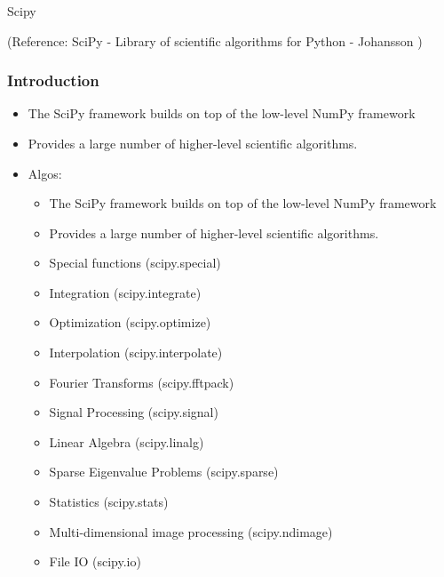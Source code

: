 \begin{frame}[fragile]\frametitle{}
\begin{center}
{\Large Scipy}

(Reference: 
SciPy - Library of scientific algorithms for Python - Johansson )
\end{center}
\end{frame}


\begin{frame}[fragile]\frametitle{Introduction}
 \begin{itemize}
  \item The SciPy framework builds on top of the low-level NumPy framework 
  \item Provides a large number of higher-level scientific algorithms. 
  \item Algos:
   \begin{itemize}
  \item The SciPy framework builds on top of the low-level NumPy framework 
  \item Provides a large number of higher-level scientific algorithms. 
  \item Special functions (scipy.special)
  \item Integration (scipy.integrate)
  \item Optimization (scipy.optimize)
  \item Interpolation (scipy.interpolate)
  \item Fourier Transforms (scipy.fftpack)
  \item Signal Processing (scipy.signal)
  \item Linear Algebra (scipy.linalg)
  \item Sparse Eigenvalue Problems (scipy.sparse)
  \item Statistics (scipy.stats)
  \item Multi-dimensional image processing (scipy.ndimage)
  \item File IO (scipy.io)
 \end{itemize}
 \end{itemize}
\end{frame}


